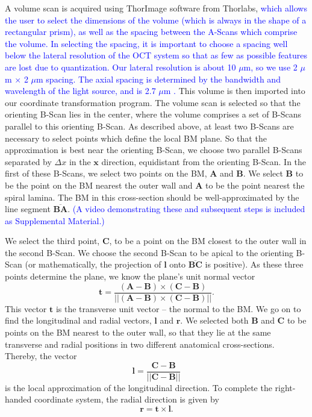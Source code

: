 \documentclass[preprint,NumberedRefs]{JASA}
\begin{document}
\par{A volume scan is acquired using ThorImage software from Thorlabs, \textcolor{blue}{which allows the user to select the dimensions of the volume (which is always in the shape of a rectangular prism), as well as the spacing between the A-Scans which comprise the volume. In selecting the spacing, it is important to choose a spacing well below the lateral resolution of the OCT system so that as few as possible features are lost due to quantization. Our lateral resolution is about 10 $\mu$m, so we use 2 $\mu$m $\times$ 2 $\mu$m spacing. The axial spacing is determined by the bandwidth and wavelength of the light source, and is 2.7 $\mu$m \cite{OCTtheory}.} This volume is then imported into our coordinate transformation program. The volume scan is selected so that the orienting B-Scan lies in the center, where the volume comprises a set of  B-Scans parallel to this orienting B-Scan. As described above, at least two B-Scans are necessary to select points which define the local BM plane. So that the approximation is best near the orienting B-Scan, we choose two parallel B-Scans separated by $\Delta x$ in the $\mathbf{x}$ direction, equidistant from the orienting B-Scan. In the first of these B-Scans, we select two points on the BM,  $\mathbf{A}$ and $\mathbf{B}$. We select $\mathbf{B}$ to be the point on the BM nearest the outer wall and $\mathbf{A}$ to be the point nearest the spiral lamina. The BM in this cross-section should be well-approximated by the line segment $\overline{\mathbf{B}\mathbf{A}}$. \textcolor{blue}{(A video demonstrating these and subsequent steps is included as Supplemental Material.)}}
\par{We select the third point, $\mathbf{C}$, to be a point on the BM closest to the outer wall in the second B-Scan. We choose the second B-Scan to be apical to the orienting B-Scan (or mathematically, the projection of $\mathbf{l}$ onto $\overline{\mathbf{BC}}$ is positive).  As these three points determine the plane, we know the plane's unit normal vector \begin{equation}
\mathbf{t} = \frac{(\mathbf{A}-\mathbf{B})\times(\mathbf{C}-\mathbf{B})}{||(\mathbf{A}-\mathbf{B})\times(\mathbf{C}-\mathbf{B})||}.
\end{equation}
This vector $\mathbf{t}$ is the transverse unit vector -- the normal to the BM. We go on to find the longitudinal and radial vectors, $\mathbf{l}$ and $\mathbf{r}$. We selected both $\mathbf{B}$ and $\mathbf{C}$ to be points on the BM nearest to the outer wall, so that they lie at the same transverse and radial positions in two different anatomical cross-sections. Thereby, the vector 
\begin{equation}
\mathbf{l} = \frac{\mathbf{C}-\mathbf{B}}{||\mathbf{C}-\mathbf{B}||}
\end{equation}
is the local approximation of the longitudinal direction. To complete the right-handed coordinate system, the radial direction is given by 
\begin{equation}
\mathbf{r} = \mathbf{t}\times\mathbf{l}.
\end{equation}}
\end{document}
